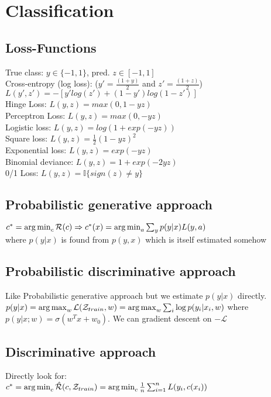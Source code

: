\section{Classification}
\subsection*{Loss-Functions}
True class: $y \in \{-1,1\}$, pred. $z \in [-1,1]$\\
Cross-entropy (log loss): ($y'=\tfrac{(1+y)}{2}$ and $z'=\tfrac{(1+z)}{2}$) $L(y',z') {=} -[y'log(z') {+} (1-y')log(1-z')]$ \\
Hinge Loss: $L(y,z) = max(0, 1-yz)$ \\
Perceptron Loss: $L(y,z) = max(0, -yz)$ \\
Logistic loss: $L(y,z) = log(1 + exp(-yz))$ \\
Square loss: $L(y,z) = \tfrac{1}{2}(1-yz)^2$ \\
Exponential loss: $L(y,z) = exp(-yz)$ \\
Binomial deviance: $L(y,z) = 1 + exp(-2yz)$ \\
0/1 Loss: $L(y,z) = \mathbb{I}\{sign(z)\neq y\}$ 
\subsection*{Probabilistic generative approach}
\( c^{*}=\operatorname*{arg\,min}_c \mathcal{R}(c) \Rightarrow c^{*}(x) = \operatorname*{arg\,min}_a \sum_y p(y\vert x)L(y,a)\) \\where \(p(y\vert x) \) is found from \(p(y,x)\) which is itself estimated somehow

\subsection*{Probabilistic discriminative approach}
Like Probabilistic generative approach but we estimate \(p(y\vert x)\) directly. \\\(p(y\vert x)=\operatorname*{arg\,max}_w \mathcal{L}(\mathcal{Z}_{train}, w)= \operatorname*{arg\,max}_w\sum_i\log{p(y_i\vert x_i, w)}\) where \(p(y\vert x; w) = \sigma(w^Tx + w_0)\). We can gradient descent on \(-\mathcal{L}\)

\subsection*{Discriminative approach}
Directly look for:\\ \(c^{*} = \operatorname*{arg\,min}_c\hat{\mathcal{R}}(c, \mathcal{Z}_{train}) = \operatorname*{arg\,min}_c \frac{1}{n}\sum_{i=1}^{n}L(y_i, c(x_i))\)


